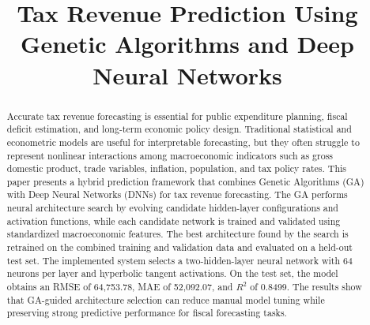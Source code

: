 \documentclass[conference]{IEEEtran}
\begin{document}
\title{Tax Revenue Prediction Using Genetic Algorithms and Deep Neural Networks}

\author{
\and
{}
\and
{}
}

\maketitle

\begin{abstract}
Accurate tax revenue forecasting is essential for public expenditure planning, fiscal deficit estimation, and long-term economic policy design. Traditional statistical and econometric models are useful for interpretable forecasting, but they often struggle to represent nonlinear interactions among macroeconomic indicators such as gross domestic product, trade variables, inflation, population, and tax policy rates. This paper presents a hybrid prediction framework that combines Genetic Algorithms (GA) with Deep Neural Networks (DNNs) for tax revenue forecasting. The GA performs neural architecture search by evolving candidate hidden-layer configurations and activation functions, while each candidate network is trained and validated using standardized macroeconomic features. The best architecture found by the search is retrained on the combined training and validation data and evaluated on a held-out test set. The implemented system selects a two-hidden-layer neural network with 64 neurons per layer and hyperbolic tangent activations. On the test set, the model obtains an RMSE of 64,753.78, MAE of 52,092.07, and $R^{2}$ of 0.8499. The results show that GA-guided architecture selection can reduce manual model tuning while preserving strong predictive performance for fiscal forecasting tasks.
\end{abstract}
\end{document}
